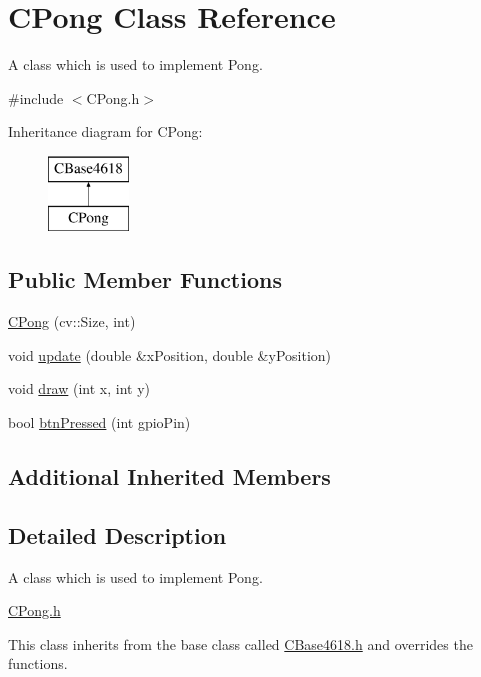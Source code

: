 \hypertarget{class_c_pong}{}\section{C\+Pong Class Reference}
\label{class_c_pong}


A class which is used to implement Pong.  




{\ttfamily \#include $<$C\+Pong.\+h$>$}

Inheritance diagram for C\+Pong\+:\begin{figure}[H]
\begin{center}
\leavevmode
\includegraphics[height=2.000000cm]{class_c_pong}
\end{center}
\end{figure}
\subsection*{Public Member Functions}
\begin{DoxyCompactItemize}
\item 
\hyperlink{class_c_pong_a6eb8c1a5601f06350cc0c3d30fbc392a}{C\+Pong} (cv\+::\+Size, int)
\item 
void \hyperlink{class_c_pong_a036cdd714486e765a658b835547d058e}{update} (double \&x\+Position, double \&y\+Position)
\item 
void \hyperlink{class_c_pong_ac4687aab31fbe5912cac2058663163fa}{draw} (int x, int y)
\item 
bool \hyperlink{class_c_pong_a74d1c17870e642d1567833a9f40c870e}{btn\+Pressed} (int gpio\+Pin)
\end{DoxyCompactItemize}
\subsection*{Additional Inherited Members}


\subsection{Detailed Description}
A class which is used to implement Pong. 

\hyperlink{_c_pong_8h_source}{C\+Pong.\+h}

This class inherits from the base class called \hyperlink{_c_base4618_8h_source}{C\+Base4618.\+h} and overrides the functions.

